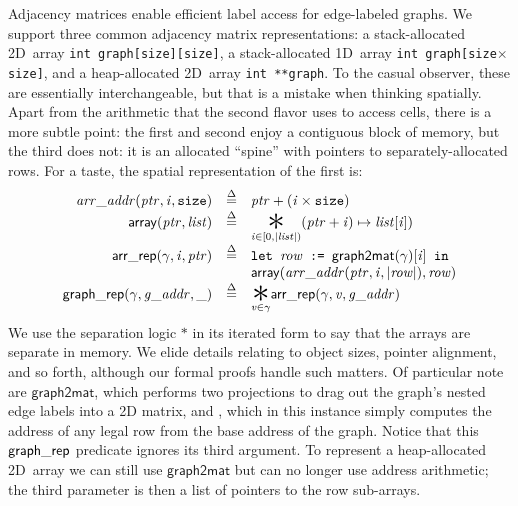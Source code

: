Adjacency matrices enable efficient label access for edge-labeled graphs.
We support three common
adjacency matrix representations:
a stack-allocated 2D~array \texttt{int~graph[size][size]},
a stack-allocated 1D~array \texttt{int~graph[size$\times$size]},
and a heap-allocated 2D~array \texttt{int~**graph}.
To the casual observer, these are essentially interchangeable, but
that is a mistake when thinking spatially. Apart from the
arithmetic that the second flavor uses to access cells, there is a
more subtle point: the first and second enjoy a contiguous block of
memory, but the third does not: it is an allocated ``spine'' with pointers to separately-allocated rows.
For a taste, the spatial representation of the first is:
\begin{equation*}
\begin{array}{r@{\quad}c@{\quad}l}
\m{arr\_addr} (\m{ptr}, \m{i},\texttt{size}) & \defeq &
  \m{ptr} + (\m{i} \times \hide{\texttt{sizeof}(\texttt{int}) \times} \texttt{size}) \\
\mathsf{array}(\m{ptr},\m{list}) & \defeq& \underset{\m{i} \in [0, \lvert\m{list}\rvert)}{\bigstar} (\m{ptr} + \m{i}) \mapsto \m{list}[\m{i}]) \\
\p{arr\_rep}(\gamma, \m{i}, \m{ptr}) & \defeq & \texttt{let }\m{row} \texttt{ := }\mathsf{graph2mat}(\gamma)[\m{i}] \texttt{ in } \\
&&\mathsf{array}(\m{arr\_addr}(\m{ptr},\m{i},\lvert\m{row}\rvert), \m{row}) \\
\p{graph\_rep}(\gamma, \m{g\_addr}, \_) & \defeq & \underset{\m{v} \in \gamma}{\bigstar} \p{arr\_rep}(\gamma, \m{v}, \m{g\_addr})
\end{array}
\end{equation*}
We use the separation logic $\ast$ in its iterated form
to say that the arrays are separate in memory.  We elide details relating to object sizes, pointer alignment, and so forth, although our formal proofs handle such matters.
Of particular note are $\mathsf{graph2mat}$, which performs two projections to
drag out the graph's nested edge labels into a 2D matrix, and
, which in this instance simply computes
the address of any legal row  from the base address of the graph.
Notice that this $\mathsf{graph\_rep}$ predicate ignores its third argument.
To represent a heap-allocated 2D~array we can still use $\mathsf{graph2mat}$
but can no longer use address arithmetic; the third
parameter is then a list of pointers to the row sub-arrays.

